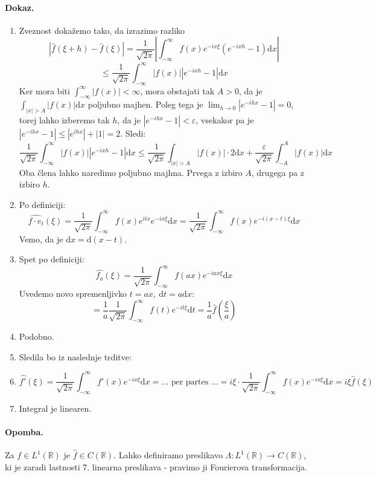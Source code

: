 \documentclass[a4paper]{article}
\newcommand{\dif}{\mathrm{d}}
\newcommand{\R}{\mathbb{R}}
\newcommand{\fn}[3]{{#1}\colon {#2} \rightarrow {#3}}
\begin{document}
\paragraph{Dokaz.}
\begin{enumerate}
    \item Zveznost dokažemo tako, da izrazimo razliko $$|\hat{f}(\xi + h) - \hat{f}(\xi)| = \frac{1}{\sqrt{2\pi}}\left|\int_{-\infty}^{\infty} f(x)e^{-ix\xi} \left(e^{-ixh} - 1\right)\dif x\right|$$
    $$\leq \frac{1}{\sqrt{2\pi}} \int_{-\infty}^{\infty} |f(x)|\left|e^{-ixh} - 1\right|\dif x$$
    Ker mora biti $\displaystyle{\int_{-\infty}^{\infty} |f(x)| < \infty}$, mora obstajati tak $A > 0$, da je $\int_{|x| > A} |f(x)|\dif x$ poljubno majhen. Poleg tega je $\lim_{h\to0}|e^{-ihx} - 1| = 0$, torej lahko izberemo tak $h$, da je $|e^{-ihx} - 1| < \varepsilon$, vsekakor pa je $|e^{-ihx} - 1| \leq |e^{ihx}| + |1| = 2$. Sledi:
    $$\frac{1}{\sqrt{2\pi}} \int_{-\infty}^{\infty} |f(x)|\left|e^{-ixh} - 1\right|\dif x \leq \frac{1}{\sqrt{2\pi}} \int_{|x| > A} |f(x)| \cdot 2 \dif x + \frac{\varepsilon}{\sqrt{2\pi}} \int_{-A}^{A}|f(x)|\dif x$$
    Oba člena lahko naredimo poljubno majhna. Prvega z izbiro $A$, drugega pa z izbiro $h$.
    \item Po definiciji: $$\widehat{f \cdot e_t}(\xi) = \frac{1}{\sqrt{2\pi}}\int_{-\infty}^{\infty} f(x)e^{itx}e^{-ix\xi}\dif x = \frac{1}{\sqrt{2\pi}}\int_{-\infty}^{\infty} f(x)e^{-i(x - t)\xi}\dif x$$ Vemo, da je $\dif x = \dif (x - t)$.
    \item Spet po definiciji: $$\widehat{f_a}(\xi) = \frac{1}{\sqrt{2\pi}}\int_{-\infty}^{\infty} f(ax) e^{-iax\xi} \dif x$$
    Uvedemo novo spremenljivko $t = ax,~\dif t = a \dif x$:
    $$= \frac{1}{a}\frac{1}{\sqrt{2\pi}}\int_{-\infty}^{\infty}f(t)e^{-it\xi}\dif t = \frac{1}{a}\widehat{f}\left(\frac{\xi}{a}\right)$$
    \item Podobno.
    \item Sledila bo iz naslednje trditve:
    \item $$\widehat{f'}(\xi) = \frac{1}{\sqrt{2\pi}}\int_{-\infty}^{\infty} f'(x)e^{-ix\xi}\dif x = ... \text{ per partes } ... = i\xi \cdot \frac{1}{\sqrt{2\pi}} \int_{-\infty}^{\infty} f(x)e^{-ix\xi}\dif x = i\xi \hat{f}(\xi)$$
    \item Integral je linearen.
\end{enumerate}
\paragraph{Opomba.} Za $f\in L^{1}(\R)$ je $\hat{f} \in C(\R)$. Lahko definiramo preslikavo $\fn{\Lambda}{L^1(\R)}{C(\R)}$, ki je zaradi lastnosti 7. linearna preslikava - pravimo ji Fourierova transformacija.
\end{document}
